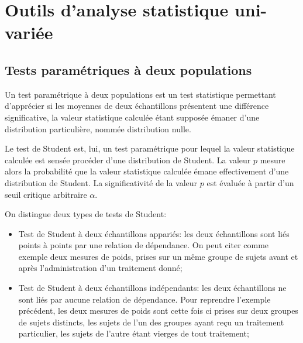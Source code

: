 \chapter{Outils d'analyse statistique uni-variée}
\label{app:statuni}


\section{Tests paramétriques à deux populations}
\label{app:Student}

Un test paramétrique à deux populations est un test statistique permettant d'apprécier si les moyennes de deux échantillons présentent une différence significative, la valeur statistique calculée étant supposée émaner d'une distribution particulière, nommée distribution nulle. 

Le test de Student est, lui, un test paramétrique pour lequel la valeur statistique calculée est sensée procéder d'une distribution de Student. La valeur $p$ mesure alors la probabilité que la valeur statistique calculée émane effectivement d'une distribution de Student. La significativité de la valeur $p$ est évaluée à partir d'un seuil critique arbitraire $\alpha$.

On distingue deux types de tests de Student:

\begin{itemize}
\item Test de Student à deux échantillons appariés: les deux échantillons sont liés points à points par une relation de dépendance. On peut citer comme exemple deux mesures de poids, prises sur un même groupe de sujets avant et après l'administration d'un traitement donné; 
\item Test de Student à deux échantillons indépendants: les deux échantillons ne sont liés par aucune relation de dépendance. Pour reprendre l'exemple précédent, les deux mesures de poids sont cette fois ci prises sur deux groupes de sujets distincts, les sujets de l'un des groupes ayant reçu un traitement particulier, les sujets de l'autre étant vierges de tout traitement;
\end{itemize}

